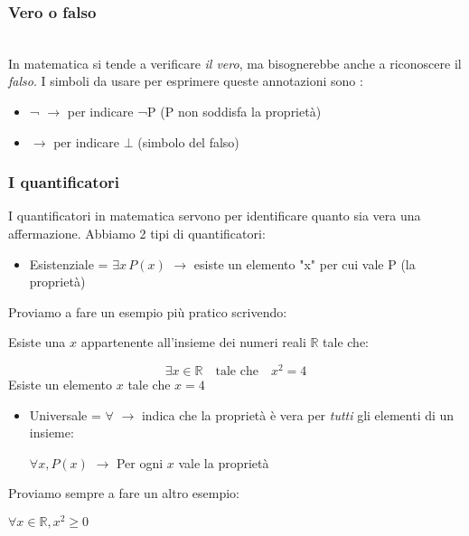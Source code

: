 \documentclass[article,12pt]{book}
\begin{document}
\subsubsection{Vero o falso} \\[1ex]
In matematica si tende a verificare \textit{il vero}, ma bisognerebbe anche a riconoscere il \textit{falso}.
I simboli da usare per esprimere queste annotazioni sono :
\begin{itemize}
    \item ¬ \( \rightarrow \) per indicare ¬P (P non soddisfa la proprietà)
    \item \bot \( \rightarrow \) per indicare \( \bot \) (simbolo del falso)
\end{itemize}

\subsubsection{I quantificatori}
I quantificatori in matematica servono per identificare quanto sia vera una affermazione.
Abbiamo 2 tipi di quantificatori: 

\begin{itemize}
    \item Esistenziale = \(\exists x \, P(x) \) \(\rightarrow \) esiste un elemento "x" per cui vale P (la proprietà)

\end{itemize}
Proviamo a fare un esempio più pratico scrivendo:
\begin{center}
    Esiste una \( x \) appartenente all'insieme dei numeri reali \( \mathbb{R} \) tale che:

\[
\exists x \in \mathbb{R} \quad \text{tale che} \quad x^2 = 4 
\] 
Esiste un elemento $x$ tale che \(x = 4 \)
\end{center}
\begin{itemize}
    \item Universale = \(\forall\) \(\rightarrow\) indica che la proprietà è vera per \textit{tutti} gli elementi di un insieme:
    \begin{center}
        \(\forall x, P(x) \) \(\rightarrow\) Per ogni $x$ vale la proprietà  
    \end{center}
\end{itemize}
Proviamo sempre a fare un altro esempio:
\begin{center}
    \(\forall x \in \mathbb{R}, x^2 \geq 0 \)
\end{center}
\end{document}
